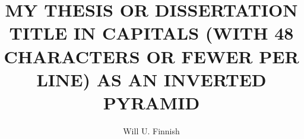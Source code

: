 \documentclass[12pt,econ]{sources/authesis}
\title{MY THESIS OR DISSERTATION TITLE IN CAPITALS (WITH 48 CHARACTERS OR FEWER
PER LINE) AS AN INVERTED PYRAMID}
\author{Will U. Finnish}
\begin{document}
%
%



\maketitle

\maketitle


\copyrightpage
\end{document}
